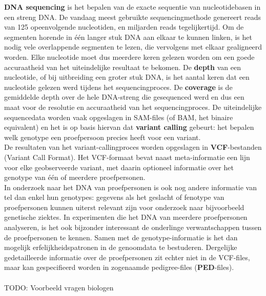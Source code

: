 \textbf{DNA sequencing} is het bepalen van de exacte sequentie van nucleotidebasen in een streng DNA. De vandaag meest gebruikte sequencingmethode genereert reads van 125 opeenvolgende nucleotiden, en miljarden reads tegelijkertijd. Om de segmenten horende in \'e\'en langer stuk DNA aan elkaar te kunnen linken, is het nodig vele overlappende segmenten te lezen, die vervolgens met elkaar gealigneerd worden. Elke nucleotide moet dus meerdere keren gelezen worden om een goede accuraatheid van het uiteindelijke resultaat te bekomen. De \textbf{depth} van een nucleotide, of bij uitbreiding een groter stuk DNA, is het aantal keren dat een nucleotide gelezen werd tijdens het sequencingproces. De \textbf{coverage} is de gemiddelde depth over de hele DNA-streng die gesequenced werd en dus een maat voor de resolutie en accuraatheid van het sequencingproces. De uiteindelijke sequencedata worden vaak opgeslagen in SAM-files (of BAM, het binaire equivalent) en het is op basis hiervan dat \textbf{variant calling} gebeurt: het bepalen welk genotype een proefpersoon precies heeft voor een variant.\\
De resultaten van het variant-callingproces worden opgeslagen in \textbf{VCF}-bestanden (Variant Call Format). Het VCF-formaat bevat naast meta-informatie een lijn voor elke geobserveerde variant, met daarin optioneel informatie over het genotype van \'e\'en of meerdere proefpersonen.\\
In onderzoek naar het DNA van proefpersonen is ook nog andere informatie van tel dan enkel hun genotypes: gegevens als het geslacht of fenotype van proefpersonen kunnen uiterst relevant zijn voor onderzoek naar bijvoorbeeld genetische ziektes. In experimenten die het DNA van meerdere proefpersonen analyseren, is het ook bijzonder interessant de onderlinge verwantschappen tussen de proefpersonen te kennen. Samen met de genotype-informatie is het dan mogelijk erfelijkheidspatronen in de genoomdata te bestuderen. Dergelijke gedetailleerde informatie over de proefpersonen zit echter niet in de VCF-files, maar kan gespecifieerd worden in zogenaamde pedigree-files (\textbf{PED}-files).\\\\

{\color{red}TODO: Voorbeeld vragen biologen}